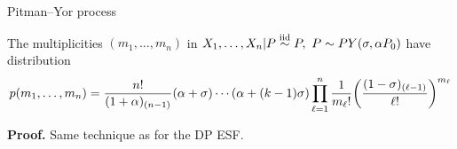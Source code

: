 \begin{frame}[allowframebreaks]{Pitman--Yor process}
	\begin{proposition}
 The multiplicities $(m_1,\ldots,m_n)$ in $X_1,\ldots, X_n|P\stackrel{\mbox{\scriptsize{iid}}}{\sim} P,\ P\sim PY(\sigma, \alpha P_0)$ have distribution
\begin{equation*}
    p(m_1,\ldots,m_n)=\frac{n!}{(1+\alpha)_{(n-1)}}(\alpha +\sigma)\cdots (\alpha+(k-1)\sigma)\prod_{\ell=1}^n\frac{1}{m_\ell!}\bigg(\frac{(1-\sigma)_{(\ell-1)} }{\ell!}\bigg)^{m_\ell}
\end{equation*}
\end{proposition}


\textbf{Proof.}
Same technique as for the DP ESF.



\framebreak

\begin{columns}


\end{columns}
\end{frame}
